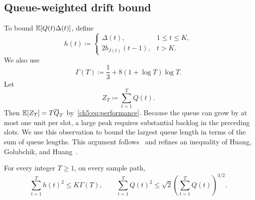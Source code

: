 \subsection{Queue-weighted drift bound}
\label{ch5:upper:sec:stage-two}

To bound $\mathbb{E}[Q(t)\Delta(t)]$, define
\begin{equation}
 h(t)\coloneqq
 \begin{cases}
  \Delta(t),&1\le t\le K,\\[1mm]
  2b_{J(t)}(t-1),&t>K.
 \end{cases}
 \label{ch5:upper:eq:radius-budget}
\end{equation}
We also use
\begin{equation}
 \Gamma(T)\coloneqq\frac13+8(1+\log T)\log T.
 \label{ch5:upper:eq:budget-function}
\end{equation}
Let
\[
 Z_T\coloneqq\sum_{t=1}^{T}Q(t).
\]
Then $\mathbb{E}[Z_T]=T\overline Q_T$ by~\eqref{ch5:eq:performance}.
Because the queue can grow by at most one unit per slot, a large peak
requires substantial backlog in the preceding slots. We use this
observation to bound the largest queue length in terms of the sum of queue
lengths. This argument follows~\cite[Lemma~3.4]{Freund2025transient} and
refines an inequality of Huang, Golubchik, and Huang~\cite{Huang2024}.

\begin{Thm:Lemma}
\label{ch5:upper:lem:deterministic}
For every integer $T\ge1$, on every sample path,
\begin{equation}
 \sum_{t=1}^{T}h(t)^2\le K\Gamma(T),
 \qquad
 \sum_{t=1}^{T}Q(t)^2
 \le\sqrt2\left(\sum_{t=1}^{T}Q(t)\right)^{3/2}.
 \label{ch5:upper:eq:deterministic}
\end{equation}
\end{Thm:Lemma}

